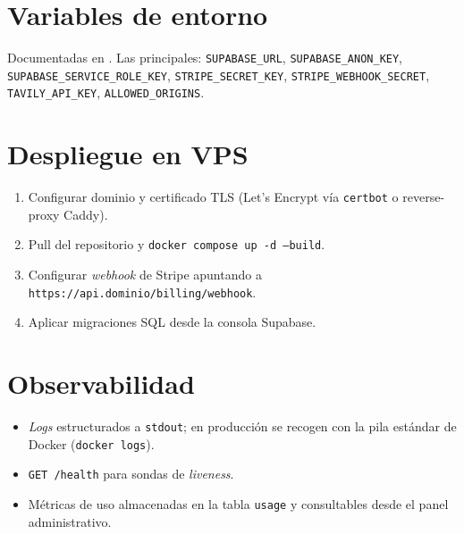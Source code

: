 \section{Variables de entorno}

Documentadas en . Las principales:
\texttt{SUPABASE\_URL}, \texttt{SUPABASE\_ANON\_KEY},
\texttt{SUPABASE\_SERVICE\_ROLE\_KEY},
\texttt{STRIPE\_SECRET\_KEY}, \texttt{STRIPE\_WEBHOOK\_SECRET},
\texttt{TAVILY\_API\_KEY},
\texttt{ALLOWED\_ORIGINS}.

\section{Despliegue en VPS}

\begin{enumerate}[leftmargin=*,itemsep=0.2em]
  \item Configurar dominio y certificado TLS (Let's Encrypt vía
        \texttt{certbot} o reverse-proxy Caddy).
  \item Pull del repositorio y \texttt{docker compose up -d --build}.
  \item Configurar \emph{webhook} de Stripe apuntando a
        \texttt{https://api.dominio/billing/webhook}.
  \item Aplicar migraciones SQL desde la consola Supabase.
\end{enumerate}

\section{Observabilidad}

\begin{itemize}[leftmargin=*,itemsep=0.2em]
  \item \emph{Logs} estructurados a \texttt{stdout}; en producción se
        recogen con la pila estándar de Docker (\texttt{docker logs}).
  \item \texttt{GET /health} para sondas de \emph{liveness}.
  \item Métricas de uso almacenadas en la tabla \texttt{usage} y
        consultables desde el panel administrativo.
\end{itemize}
